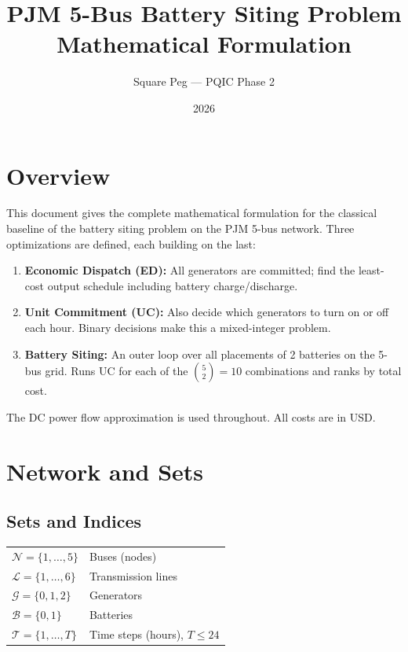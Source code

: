 \documentclass[11pt, letterpaper]{article}
\title{\textbf{PJM 5-Bus Battery Siting Problem}\\[0.4em]
       \large Mathematical Formulation}
\author{Square Peg --- PQIC Phase 2}
\date{2026}
\begin{document}
\maketitle
\tableofcontents
\vspace{1em}

\section{Overview}

This document gives the complete mathematical formulation for the classical baseline
of the battery siting problem on the PJM 5-bus network. Three optimizations are
defined, each building on the last:

\begin{enumerate}[leftmargin=2em]
  \item \textbf{Economic Dispatch (ED):} All generators are committed; find the
        least-cost output schedule including battery charge/discharge.
  \item \textbf{Unit Commitment (UC):} Also decide which generators to turn on or
        off each hour. Binary decisions make this a mixed-integer problem.
  \item \textbf{Battery Siting:} An outer loop over all placements of 2 batteries
        on the 5-bus grid. Runs UC for each of the $\binom{5}{2}=10$ combinations
        and ranks by total cost.
\end{enumerate}

The DC power flow approximation is used throughout. All costs are in USD.

\section{Network and Sets}

\subsection{Sets and Indices}

\begin{tabular}{@{}ll@{}}
  $\mathcal{N} = \{1,\dots,5\}$   & Buses (nodes) \\
  $\mathcal{L} = \{1,\dots,6\}$   & Transmission lines \\
  $\mathcal{G} = \{0,1,2\}$       & Generators \\
  $\mathcal{B} = \{0,1\}$         & Batteries \\
  $\mathcal{T} = \{1,\dots,T\}$   & Time steps (hours), $T \leq 24$ \\
\end{tabular}
\end{document}
